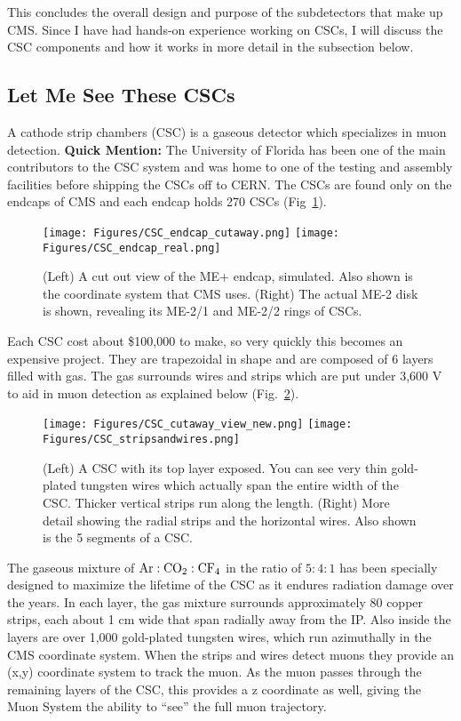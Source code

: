 This concludes the overall design and purpose of the subdetectors that make up CMS.
Since I have had hands-on experience working on CSCs, I will discuss the CSC components and how it works in more detail in the subsection below.

\subsection{Let Me See These CSCs}

A cathode strip chambers (CSC) is a gaseous detector which specializes in muon detection. 
{\bf Quick Mention:} The University of Florida has been one of the main contributors to the CSC system and was home to one of the testing and assembly facilities before shipping the CSCs off to CERN.
The CSCs are found only on the endcaps of CMS and each endcap holds 270 CSCs (Fig~\ref{fig:CMS_endcap}). 
\begin{figure}[pbth]
\centering
\texttt{[image: Figures/CSC\_endcap\_cutaway.png]}
\texttt{[image: Figures/CSC\_endcap\_real.png]}
    \caption{
    (Left) A cut out view of the ME+ endcap, simulated. Also shown is the coordinate system that CMS uses.
    (Right) The actual ME-2 disk is shown, revealing its ME-2/1 and ME-2/2 rings of CSCs.
    }
    \label{fig:CMS_endcap}
\end{figure}
Each CSC cost about \$100,000 to make, so very quickly this becomes an expensive project.
They are trapezoidal in shape and are composed of 6 layers filled with gas.
The gas surrounds wires and strips which are put under 3,600 V to aid in muon detection as explained below (Fig.~\ref{fig:CSC_guts}). 
\begin{figure}[pbth]
\centering
\texttt{[image: Figures/CSC\_cutaway\_view\_new.png]}
\texttt{[image: Figures/CSC\_stripsandwires.png]}
    \caption{
    (Left) A CSC with its top layer exposed. You can see very thin gold-plated tungsten wires which actually span the entire width of the CSC. 
    Thicker vertical strips run along the length.
    (Right) More detail showing the radial strips and the horizontal wires. Also shown is the 5 segments of a CSC.
    }
    \label{fig:CSC_guts}
\end{figure}
The gaseous mixture of ${\rm Ar:CO_{2}:CF_{4} }$ in the ratio of $5:4:1$ has been specially designed to maximize the lifetime of the CSC as it endures radiation damage over the years. 
In each layer, the gas mixture surrounds approximately 80 copper strips, each about 1 cm wide that span radially away from the IP.
Also inside the layers are over 1,000 gold-plated tungsten wires, which run azimuthally in the CMS coordinate system.
When the strips and wires detect muons they provide an (x,y) coordinate system to track the muon. 
As the muon passes through the remaining layers of the CSC, this provides a z coordinate as well, giving the Muon System the ability to ``see'' the full muon trajectory.

